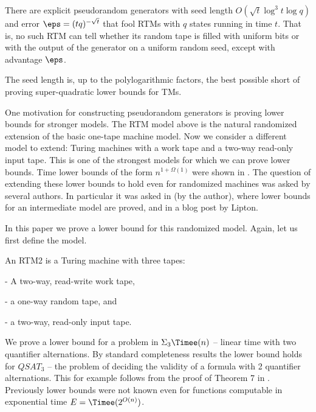 \begin{thm}
\label{thm:prg} There are explicit pseudorandom generators with seed
length $O(\sqrt{t}\log^{3}t\log q)$ and error $\eps=(tq)^{-\sqrt{t}}$
that fool RTMs with $q$ states running in time $t$. That is, no
such RTM can tell whether its random tape is filled with uniform bits
or with the output of the generator on a uniform
random  %
seed, except with advantage $\eps$.
\end{thm}

%

The seed length is, up to the polylogarithmic factors, the best possible
short of proving super-quadratic lower bounds for TMs.

\medskip

One motivation for constructing pseudorandom generators is proving
lower bounds for stronger models. The RTM model above is the natural
randomized extension of the basic one-tape machine model. Now we consider
a different model to extend: Turing machines with a work tape and
a two-way read-only input tape\emph{.} This is one of the strongest
models for which we can prove lower bounds. Time lower bounds of the
form $n^{1+\Omega(1)}$ were shown in \cite{MaS87,DBLP:journals/tcs/MelkebeekR05,DBLP:journals/cc/Williams06}.
The question of extending these lower bounds to hold even for randomized
machines was asked by several authors. In particular it was asked
in \cite{Viola-PhDthesis-journal-hack,ViolaBPvsE} (by the author),
where lower bounds for an intermediate model are proved, and in a
blog post \cite{Lipton-old-ideas-and-lower-bounds-on-sat} by Lipton.

In this paper we prove a lower bound for this randomized model. Again,
let us first define the model.
\begin{defn}
An RTM2 is a Turing machine with three tapes:

- A two-way, read-write work tape,

- a one-way random tape, and

- a two-way, read-only input tape.
\end{defn}

We prove a lower bound for a problem in $\Sigma_{3}\Timee(n)$ -- linear
time with two quantifier alternations. By standard completeness results
the lower bound holds for $QSAT_{3}$ -- the problem of deciding
the validity of a formula with 2 quantifier alternations. This for
example follows from the proof of Theorem 7 in \cite{DvM06}. Previously
lower bounds were not known even for functions computable in exponential
time $E=\Timee(2^{O(n)})$.

